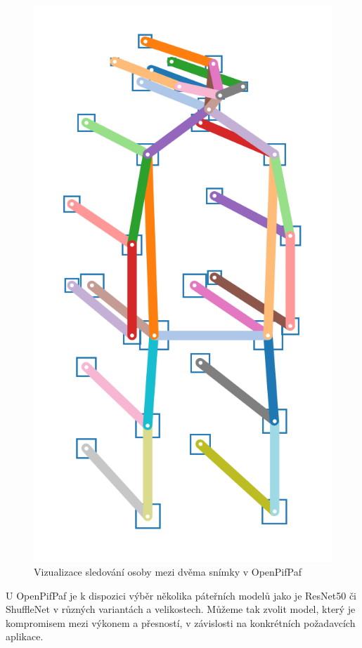 \begin{figure}[]
    \centering
    \includegraphics[height=0.2\textheight]{Figures/skeleton_forward2.png}
    \caption{Vizualizace  sledování osoby mezi dvěma snímky v OpenPifPaf \cite{openpifpaf}}
    \label{fig:pipaf-tracking}
\end{figure}

U OpenPifPaf je k dispozici výběr několika páteřních modelů jako je ResNet50 či
ShuffleNet v různých variantách a velikostech. Můžeme tak zvolit model, který
je kompromisem mezi výkonem a přesností, v závislosti na konkrétních
požadavcích aplikace.

